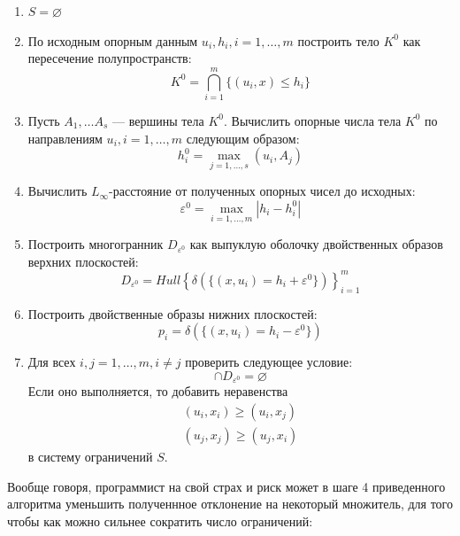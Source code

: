 \documentclass[a4paper, 10pt]{article}
\theoremstyle{definition}
\theoremstyle{plain}
\theoremstyle{plain}
\begin{document}
\begin{enumerate}
 \item $S = \varnothing$
 \item По исходным опорным данным $u_{i}, h_{i}, i = 1, \ldots, m$
 построить тело $K^{0}$ как пересечение полупространств:
 \begin{equation}
  K^{0} = \bigcap \limits_{i = 1}^{m} \{(u_{i}, x) \leq h_{i}\}
 \end{equation}
 \item Пусть $A_{1}, \ldots A_{s}$ --- вершины тела $K^{0}$. Вычислить опорные
 числа тела $K^{0}$ по направлениям $u_{i}, i = 1, \ldots, m$ следующим образом:
 \begin{equation}
  h^{0}_{i} = \max \limits_{j = 1, \ldots, s} (u_{i}, A_{j})
 \end{equation}
 \item Вычислить $L_{\infty}$-расстояние от полученных опорных чисел до
 исходных:
 \begin{equation}
  \varepsilon^{0} = \max \limits_{i = 1, \ldots, m} |h_{i} - h^{0}_{i}|
 \end{equation}
 \item Построить многогранник $D_{\varepsilon^{0}}$ как выпуклую оболочку
 двойственных образов верхних плоскостей:
 \begin{equation}
  D_{\varepsilon^{0}} =
  Hull \left\{
  \delta(\{(x, u_{i}) = h_{i} + \varepsilon^{0}\})
  \right\}_{i = 1}^{m}
 \end{equation}
 \item Построить двойственные образы нижних плоскостей:
 \begin{equation}
  p_{i} = \delta(\{(x, u_{i}) = h_{i} - \varepsilon^{0}\})
 \end{equation}
 \item Для всех $i, j = 1, \ldots, m, i \neq j$ проверить следующее условие:
 \begin{equation}
  [p_{i}, p_{j}] \cap D_{\varepsilon^{0}} = \varnothing
 \end{equation}
 Если оно выполняется, то добавить неравенства
 \begin{equation}
 \begin{split}
  (u_{i}, x_{i}) \geq (u_{i}, x_{j}) \\
  (u_{j}, x_{j}) \geq (u_{j}, x_{i})
 \end{split}
 \end{equation}
 в систему ограничений $S$.
\end{enumerate}

Вообще говоря, программист на свой страх и риск может в шаге 4 приведенного
алгоритма уменьшить полученнное отклонение на некоторый множитель, для того
чтобы как можно сильнее сократить число ограничений:
\end{document}

